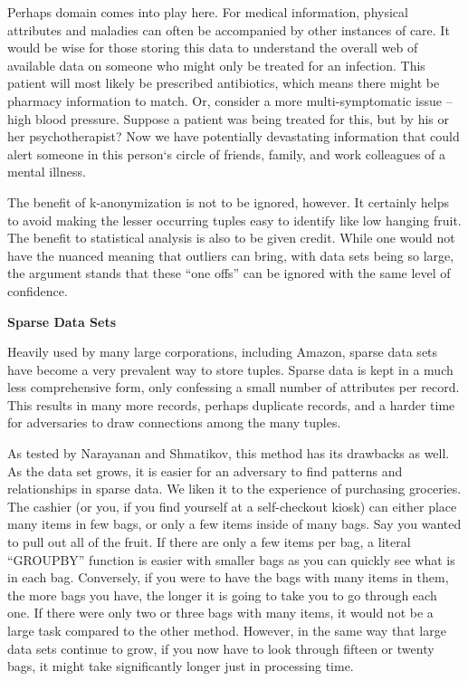 \documentclass[10pt,journal,compsoc]{IEEEtran}
\begin{document}
	Perhaps domain comes into play here.  For medical information, physical attributes and maladies can often be accompanied by other instances of care.  It would be wise for those storing this data to understand the overall web of available data on someone who might only be treated for an infection.  This patient will most likely be prescribed antibiotics, which means there might be pharmacy information to match.   Or, consider a more multi-symptomatic  issue – high blood pressure.  Suppose a patient was being treated for this, but by his or her psychotherapist?  Now we have potentially devastating information that could alert someone in this person`s circle of friends, family, and work colleagues of a mental illness.
	
	The benefit of k-anonymization is not to be ignored, however.  It certainly helps to avoid making the lesser occurring tuples easy to identify like low hanging fruit.  The benefit to statistical analysis is also to be given credit.  While one would not have the nuanced meaning that outliers can bring, with data sets being so large, the argument stands that these “one offs” can be ignored with the same level of confidence.\linebreak


\noindent \textbf{Sparse Data Sets}

	Heavily used by many large corporations, including Amazon, sparse data sets have become a very prevalent way to store tuples\cite{narayanan,gentry,rimes}.  Sparse data is kept in a much less comprehensive form, only confessing a small number of attributes per record.  This results in many more records, perhaps duplicate records, and a harder time for adversaries to draw connections among the many tuples.
	
	As tested by Narayanan and Shmatikov, this method has its drawbacks as well.  As the data set grows, it is easier for an adversary to find patterns and relationships in sparse data.  We liken it to the experience of purchasing groceries.  The cashier (or you, if you find yourself at a self-checkout kiosk) can either place many items in few bags, or only a few items inside of many bags.  Say you wanted to pull out all of the fruit.  If there are only a few items per bag, a literal “GROUPBY” function is easier with smaller bags as you can quickly see what is in each bag.  Conversely, if you were to have the bags with many items in them, the more bags you have, the longer it is going to take you to go through each one.  If there were only two or three bags with many items, it would not be a large task compared to the other method.  However, in the same way that large data sets continue to grow, if you now have to look through fifteen or twenty bags, it might take significantly longer just in processing time.
	
\end{document}
